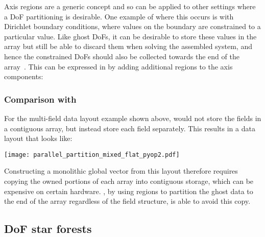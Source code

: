 \documentclass[thesis]{subfiles}
\begin{document}
Axis regions are a generic concept and so can be applied to other settings where a DoF partitioning is desirable.
One example of where this occurs is with Dirichlet boundary conditions, where values on the boundary are constrained to a particular value.
Like ghost DoFs, it can be desirable to store these values in the array but still be able to discard them when solving the assembled system, and hence the constrained DoFs should also be collected towards the end of the array~\cite{rothwellImplementingRestrictedFunction2024}.
This can be expressed in  by adding additional regions to the axis components:
\begin{pyinline}
\end{pyinline}

\subsubsection{Comparison with }

For the multi-field data layout example shown above,  would not store the fields in a contiguous array, but instead store each field separately.
This results in a data layout that looks like:
\begin{center}
  \texttt{[image: parallel\_partition\_mixed\_flat\_pyop2.pdf]}
\end{center}
Constructing a monolithic global vector from this layout therefore requires copying the owned portions of each array into contiguous storage, which can be expensive on certain hardware.
, by using regions to partition the ghost data to the end of the array regardless of the field structure, is able to avoid this copy.

\subsection{DoF star forests}
\label{sec:parallel_star_forests}
\end{document}
